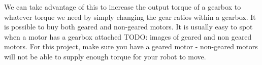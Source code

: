\documentclass[../TinyBot.tex]{subfiles}
\begin{document}
\bigskip

We can take advantage of this to increase the output torque of a gearbox to whatever torque we need by simply changing the gear ratios within a gearbox. It is possible to buy both geared and non-geared motors. It is usually easy to spot when a motor has a gearbox attached TODO: images of geared and non geared motors. For this project, make sure you have a geared motor - non-geared motors will not be able to supply enough torque for your robot to move. 



\end{document}
